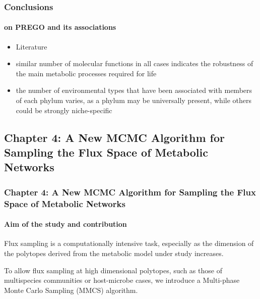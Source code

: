 \documentclass{beamer}
\begin{document}
   \begin{frame}
      \frametitle{Conclusions}
      \framesubtitle{on PREGO and its associations}

      \small
      \begin{itemize}
         \item Literature 
         \item similar number of molecular functions in all cases indicates the robustness of the main
         metabolic processes required for life
         \item the number of environmental types that have been associated with members of each phylum varies, as a phylum may be universally present, while others could be
         strongly niche-specific
      \end{itemize}

   \end{frame}



   \begin{darkframes}
      \section{
         \textbf{Chapter 4}: A New MCMC Algorithm for Sampling the Flux Space of Metabolic Networks
      }   
   \end{darkframes}

    \begin{darkframes}
      \begin{frame}
         \frametitle{\textbf{Chapter 4}: A New MCMC Algorithm for Sampling
         the Flux Space of Metabolic Networks}
         \framesubtitle{Aim of the study and contribution}

         \small
         Flux sampling is a computationally intensive task, especially as the dimension of the 
         polytopes derived from the metabolic model under study increases. 



         To allow flux sampling at high dimensional polytopes, 
         such as those of multispecies communities or host-microbe cases,
         we introduce a Multi-phase Monte Carlo Sampling (MMCS) algorithm. 


      \end{frame}
   \end{darkframes}
\end{document}
